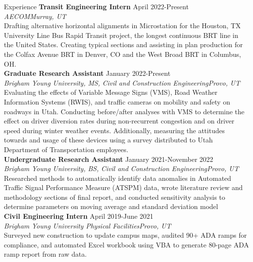 \documentclass{resume} %
\begin{document}
\begin{rSection}{Experience}
{\bf Transit Engineering Intern} \hfill {April 2022-Present} \\
{\em AECOM}\hfill {\em Murray, UT} \\
Drafting alternative horizontal alignments in Microstation for the Houston, TX University Line Bus Rapid Transit project, the longest continuous BRT line in the United States. Creating typical sections and assisting in plan production for the Colfax Avenue BRT in Denver, CO and the West Broad BRT in Columbus, OH.   \\



{\bf Graduate Research Assistant} \hfill {January 2022-Present} \\
{\em Brigham Young University, MS, Civil and Construction Engineering}\hfill {\em Provo, UT} \\
Evaluating the effects of Variable Message Signs (VMS), Road Weather Information Systems (RWIS), and traffic cameras on mobility and safety on roadways in Utah. Conducting before/after analyses with VMS to determine the effect on driver diversion rates during non-recurrent congestion and on driver speed during winter weather events. Additionally, measuring the attitudes towards and usage of these devices using a survey distributed to Utah Department of Transportation employees. \\

{\bf Undergraduate Research Assistant} \hfill {January 2021-November 2022} \\
{\em Brigham Young University, BS, Civil and Construction Engineering}\hfill {\em Provo, UT} \\
Researched methods to automatically identify data anomalies in Automated Traffic Signal Performance Measure (ATSPM) data, wrote literature review and methodology sections of final report, and conducted sensitivity analysis to determine parameters on moving average and standard deviation model \\

{\bf Civil Engineering Intern} \hfill {April 2019-June 2021} \\
{\em Brigham Young University Physical Facilities}\hfill {\em Provo, UT} \\
Surveyed new construction to update campus maps, audited 90+ ADA ramps for compliance, and automated Excel workbook using VBA to generate 80-page ADA ramp report from raw data.

\end{rSection}
\end{document}
